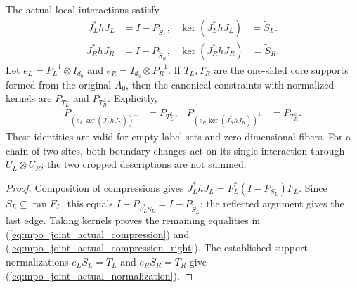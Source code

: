 \begin{theorem}
    \label{thm:mpo_joint_actual_cropped_compression}
    The actual local interactions satisfy
    \begin{align}
        J_L^*hJ_L & =I-P_{\widetilde S_L},
                  & \ker(J_L^*hJ_L)        & =\widetilde S_L.
        \label{eq:mpo_joint_actual_compression}
    \end{align}
    \begin{align}
        J_R^*hJ_R & =I-P_{\widetilde S_R},
                  & \ker(J_R^*hJ_R)        & =\widetilde S_R.
        \label{eq:mpo_joint_actual_compression_right}
    \end{align}
    Let $e_L=P_L^{-1}\otimes I_{d_0}$ and
    $e_R=I_{d_0}\otimes P_R^{-1}$. If $T_L,T_R$ are the one-sided
    core supports formed from the original $A_0$, then the canonical
    constraints with normalized kernels are $P_{T_L^\perp}$ and
    $P_{T_R^\perp}$. Explicitly,
    \begin{align}
        P_{(e_L\ker(J_L^*hJ_L))^\perp} & =P_{T_L^\perp},
                                       & P_{(e_R\ker(J_R^*hJ_R))^\perp} & =P_{T_R^\perp}.
        \label{eq:mpo_joint_actual_normalization}
    \end{align}
    These identities are valid for empty label sets and zero-dimensional
    fibers. For a chain of two sites, both boundary changes act on its
    single interaction through $U_L\otimes U_R$; the two cropped
    descriptions are not summed.
\end{theorem}
\begin{proof}
    Composition of compressions gives
    $J_L^*hJ_L=F_L^*(I-P_{S_L})F_L$.
    Since $S_L\subseteq\operatorname{ran}F_L$, this equals
    $I-P_{F_L^*S_L}=I-P_{\widetilde S_L}$; the reflected argument
    gives the last edge. Taking kernels proves the remaining equalities
    in (\ref{eq:mpo_joint_actual_compression}) and
    (\ref{eq:mpo_joint_actual_compression_right}). The established
    support normalizations $e_L\widetilde S_L=T_L$ and
    $e_R\widetilde S_R=T_R$ give
    (\ref{eq:mpo_joint_actual_normalization}).
\end{proof}

